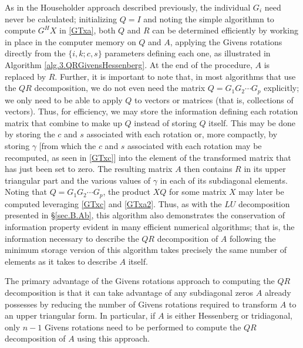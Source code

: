 As in the Householder approach described previously, the individual
$G_{i}$ need never be calculated; initializing $Q=I$ and noting the
simple algorithmn to compute $G^{H}X$ in \eqref{GTxa},
both $Q$ and $R$ can be determined efficiently by working in
place in the computer memory on $Q$ and $A$, applying the Givens
rotations directly from the $\{i,k;c,s\}$ parameters defining each
one, as illustrated in Algorithm \ref{alg.3.QRGivensHessenberg}.
At the end of the procedure, $A$ is replaced by $R$.  Further, it is important to note that, in most algorithms
that use the $QR$ decomposition, we do not even need the matrix
$Q=G_{1}G_{2}\cdots G_{p}$ explicitly; we only need to be able to
apply $Q$ to vectors or matrices (that is, collections of vectors).
Thus, for efficiency, we may store the information defining each
rotation matrix that combine to make up $Q$ instead of storing $Q$ itself.  This may be done by storing the $c$ and $s$ associated with each rotation or,
more compactly, by storing $\gamma$ [from which the $c$ and $s$ associated with each rotation may be recomputed,
as seen in \eqref{GTxc}] into the element of the transformed matrix that has
just been set to zero.  The resulting matrix $A$ then contains $R$ in
its upper triangular part and the various values of $\gamma$ in each
of its subdiagonal elements.  Noting that $Q=G_{1}G_{2}\cdots G_{p}$, the product $XQ$ for some matrix
$X$ may later be computed leveraging \eqref{GTxc} and \eqref{GTxa2}.
Thus, as with the $LU$ decomposition presented in \S \ref{sec.B.Ab},
this algorithm also demonstrates the conservation of information
property evident in many efficient numerical algorithms; that is, the
information necessary to describe the $QR$ decomposition of $A$
following the minimum storage version of this algorithm takes precisely
the same number of elements as it takes to describe $A$ itself.

The primary advantage of the Givens rotations approach to computing
the $QR$ decomposition is that it can take advantage of any subdiagonal zeros $A$ already possesses by reducing the number of Givens
rotations required to transform $A$ to an upper triangular form.  In particular,
if $A$ is either Hessenberg or tridiagonal, only $n-1$ Givens
rotations need to be performed to compute the $QR$ decomposition of
$A$ using this approach.

\enlargethispage{3pt}

\begin{figure*}[t]

\end{figure*}

